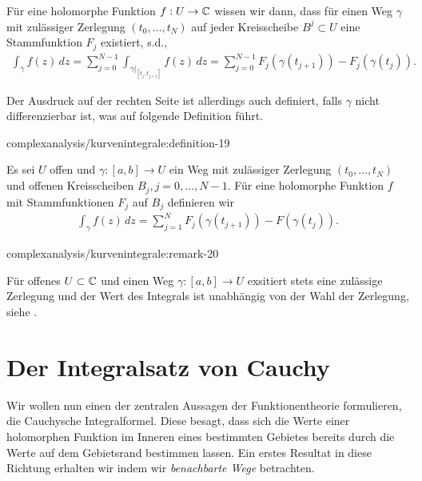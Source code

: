 \par
Für eine holomorphe Funktion \(f:U\to\mathbb{C}\) wissen wir dann, dass für einen Weg \(\gamma\) mit zulässiger Zerlegung \((t_0,\ldots,t_N)\) auf jeder Kreisscheibe \(B^j\subset U\) eine Stammfunktion \(F_j\) existiert, s.d.,
\begin{align*}
\int_\gamma f(z)\, dz= \sum_{j=0}^{N-1} \int_{\gamma\rvert_[t_j,t_{j+1}]} f(z)\, dz=
\sum_{j=0}^{N-1} F_j(\gamma(t_{j+1})) - F_j(\gamma(t_{j})).
\end{align*}
\par
Der Ausdruck auf der rechten Seite ist allerdings auch definiert, falls \(\gamma\) nicht differenzierbar ist, was auf folgende Definition führt.
\begin{definition}{}{complexanalysis/kurvenintegrale:definition-19}



\par
Es sei \(U\) offen und \(\gamma:[a,b]\to U\) ein Weg mit zulässiger Zerlegung \((t_0,\ldots,t_N)\) und offenen Kreisscheiben \(B_j,j=0,\ldots,N-1\). Für eine holomorphe Funktion \(f\) mit Stammfunktionen \(F_j\) auf \(B_j\) definieren wir
\begin{align*}
\int_\gamma f(z)\, dz = \sum_{j=1}^N F_j(\gamma(t_{j+1}))- F(\gamma(t_j)).
\end{align*}\end{definition}
\begin{remark}{}{complexanalysis/kurvenintegrale:remark-20}



\par
Für offenes \(U\subset\mathbb{C}\) und einen Weg \(\gamma:[a,b]\to U\) exsitiert stets eine zulässige Zerlegung und der Wert des Integrals ist unabhängig von der Wahl der Zerlegung, siehe \cite{Nee17}.
\end{remark}


\section{Der Integralsatz von Cauchy}
\label{\detokenize{complexanalysis/cauchyintegral:der-integralsatz-von-cauchy}}\label{\detokenize{complexanalysis/cauchyintegral::doc}}
\par
Wir wollen nun einen der zentralen Aussagen der Funktionentheorie formulieren, die Cauchysche Integralformel.
Diese besagt, dass sich die Werte einer holomorphen Funktion im Inneren eines bestimmten Gebietes bereits durch die Werte auf dem Gebietsrand bestimmen lassen. Ein erstes Resultat in diese Richtung erhalten wir indem wir \emph{benachbarte Wege} betrachten.


